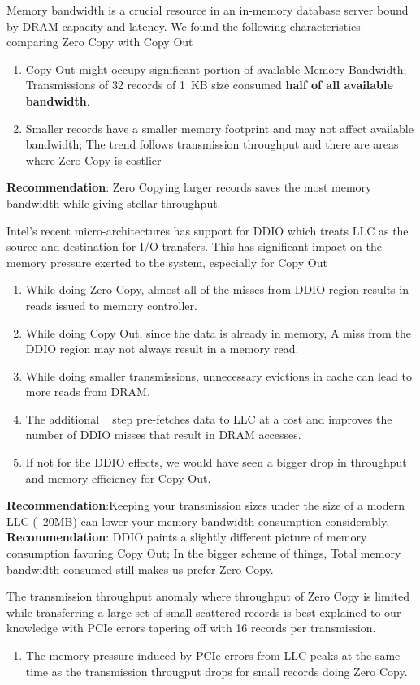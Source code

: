 Memory bandwidth is a crucial resource in an in-memory database server bound by DRAM capacity and latency. We found the following characteristics comparing 
Zero Copy with Copy Out
  \begin{enumerate}
  \item Copy Out might occupy significant portion of available Memory Bandwidth; Transmissions of 32 records of 1~KB size consumed \textbf{half of all available bandwidth}.
  \item Smaller records have a smaller memory footprint and may not affect available bandwidth; The trend follows transmission throughput and there are areas where Zero Copy is costlier
  \end{enumerate}
  \textbf{Recommendation}: Zero Copying larger records saves the most memory bandwidth while giving stellar throughput.

Intel\textregistered's recent micro-architectures has support for DDIO which treats LLC as the source and destination for I/O transfers. This has significant impact on 
the memory pressure exerted to the system, especially for Copy Out
  \begin{enumerate}
  \item While doing Zero Copy, almost all of the misses from DDIO region results in reads issued to memory controller.
  \item While doing Copy Out, since the data is already in memory, A miss from the DDIO region may not always result in a memory read.
  \item While doing smaller transmissions, unnecessary evictions in cache can lead to more reads from DRAM. 
  \item The additional \memcpy ~ step pre-fetches data to LLC at a cost and improves the number of DDIO misses that result in DRAM accesses. 
  \item If not for the DDIO effects, we would have seen a bigger drop in throughput and memory efficiency for Copy Out. 
  \end{enumerate}
  \textbf{Recommendation}:Keeping your transmission sizes under the size of a modern LLC (~20MB) can lower your memory bandwidth consumption considerably.
  \textbf{Recommendation}: DDIO paints a slightly different picture of memory consumption favoring Copy Out; In the bigger scheme of things, Total memory bandwidth consumed still makes us prefer Zero Copy.

The transmission throughput anomaly where throughput of Zero Copy is limited while transferring a large set of small scattered records is best explained to 
our knowledge with PCIe errors tapering off with 16 records per transmission.
  \begin{enumerate}
  \item The memory pressure induced by PCIe errors from LLC peaks at the same time as the transmission througput drops for small records doing Zero Copy.
  \end{enumerate}

